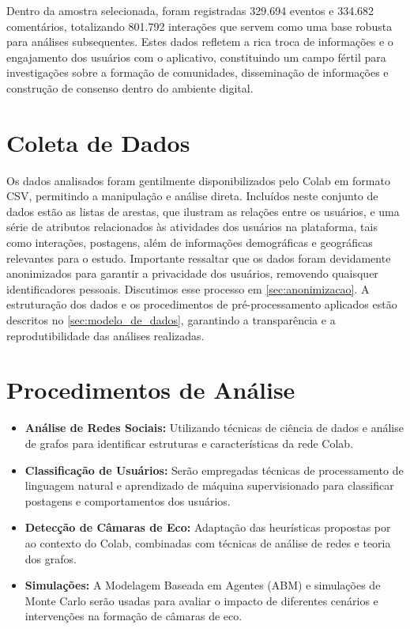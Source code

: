 Dentro da amostra selecionada, foram registradas 329.694 eventos e 334.682 comentários, totalizando 801.792 interações que servem como uma base robusta para análises subsequentes. Estes dados refletem a rica troca de informações e o engajamento dos usuários com o aplicativo, constituindo um campo fértil para investigações sobre a formação de comunidades, disseminação de informações e construção de consenso dentro do ambiente digital.

\section{Coleta de Dados}
Os dados analisados foram gentilmente disponibilizados pelo Colab em formato CSV, permitindo a manipulação e análise direta. Incluídos neste conjunto de dados estão as listas de arestas, que ilustram as relações entre os usuários, e uma série de atributos relacionados às atividades dos usuários na plataforma, tais como interações, postagens, além de informações demográficas e geográficas relevantes para o estudo. Importante ressaltar que os dados foram devidamente anonimizados para garantir a privacidade dos usuários, removendo quaisquer identificadores pessoais. Discutimos esse processo em \autoref{sec:anonimizacao}. A estruturação dos dados e os procedimentos de pré-processamento aplicados estão descritos no \autoref{sec:modelo_de_dados}, garantindo a transparência e a reprodutibilidade das análises realizadas.


\section{Procedimentos de Análise}
\begin{itemize}
	\item \textbf{Análise de Redes Sociais:} Utilizando técnicas de ciência de dados e análise de grafos para identificar estruturas e características da rede Colab.
	\item \textbf{Classificação de Usuários:} Serão empregadas técnicas de processamento de linguagem natural e aprendizado de máquina supervisionado para classificar postagens e comportamentos dos usuários.
	\item \textbf{Detecção de Câmaras de Eco:} Adaptação das heurísticas propostas por \cite{2023_Atiqi_BOOK} ao contexto do Colab, combinadas com técnicas de análise de redes e teoria dos grafos.
	\item \textbf{Simulações:} A Modelagem Baseada em Agentes (ABM) e simulações de Monte Carlo serão usadas para avaliar o impacto de diferentes cenários e intervenções na formação de câmaras de eco.
\end{itemize}

